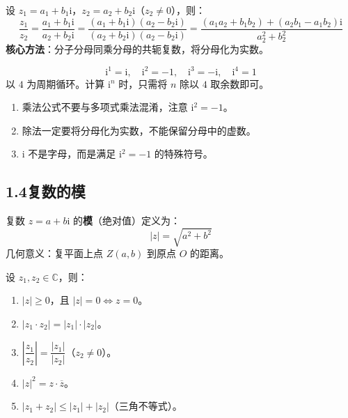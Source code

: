 \documentclass[12pt, a4paper]{ctexart}
\begin{document}
\begin{knowledgebox}[复数的除法]
设 $z_1 = a_1 + b_1\mathrm{i}$，$z_2 = a_2 + b_2\mathrm{i}$（$z_2 \neq 0$），则：
\[
  \frac{z_1}{z_2}
  = \frac{a_1 + b_1\mathrm{i}}{a_2 + b_2\mathrm{i}}
  = \frac{(a_1 + b_1\mathrm{i})(a_2 - b_2\mathrm{i})}{(a_2 + b_2\mathrm{i})(a_2 - b_2\mathrm{i})}
  = \frac{(a_1 a_2 + b_1 b_2) + (a_2 b_1 - a_1 b_2)\mathrm{i}}{a_2^2 + b_2^2}
\]
\textbf{核心方法}：分子分母同乘分母的共轭复数，将分母化为实数。
\end{knowledgebox}

\begin{tipbox}
\[
  \mathrm{i}^1 = \mathrm{i},\quad
  \mathrm{i}^2 = -1,\quad
  \mathrm{i}^3 = -\mathrm{i},\quad
  \mathrm{i}^4 = 1
\]
以 $4$ 为周期循环。计算 $\mathrm{i}^n$ 时，只需将 $n$ 除以 $4$ 取余数即可。
\end{tipbox}

\begin{warnbox}[运算易错提醒]
\begin{enumerate}[leftmargin=2em]
  \item 乘法公式不要与多项式乘法混淆，注意 $\mathrm{i}^2 = -1$。
  \item 除法一定要将分母化为实数，不能保留分母中的虚数。
  \item $\mathrm{i}$ 不是字母，而是满足 $\mathrm{i}^2 = -1$ 的特殊符号。
\end{enumerate}
\end{warnbox}

\subsection*{1.4\quad 复数的模}

\begin{knowledgebox}[复数的模]
复数 $z = a + b\mathrm{i}$ 的\textbf{模}（绝对值）定义为：
\[
  |z| = \sqrt{a^2 + b^2}
\]
几何意义：复平面上点 $Z(a,b)$ 到原点 $O$ 的距离。
\end{knowledgebox}

\begin{tipbox}[模的常用性质]
设 $z_1, z_2 \in \mathbb{C}$，则：
\begin{enumerate}[leftmargin=2em]
  \item $|z| \geqslant 0$，且 $|z| = 0 \iff z = 0$。
  \item $|z_1 \cdot z_2| = |z_1| \cdot |z_2|$。
  \item $\left|\dfrac{z_1}{z_2}\right| = \dfrac{|z_1|}{|z_2|}$（$z_2 \neq 0$）。
  \item $|z|^2 = z \cdot \overline{z}$。
  \item $|z_1 + z_2| \leqslant |z_1| + |z_2|$（三角不等式）。
\end{enumerate}
\end{tipbox}
\end{document}
